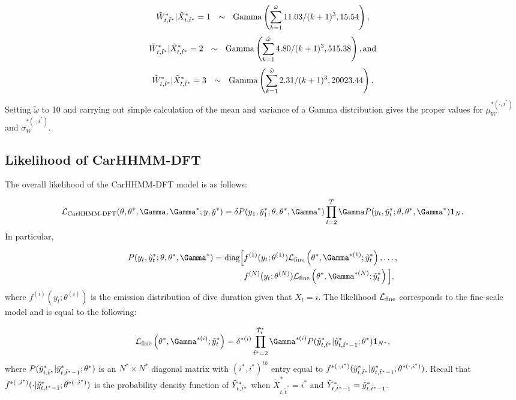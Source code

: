 \[
    \tilde{W}^*_{t,\tilde t^*}|\tilde X^*_{t,\tilde t^*} = 1  ~~ \sim ~~ {\rm{Gamma}}\left(\sum_{k=1}^{\tilde \omega} 11.03/(k+1)^3 , 15.54 \right),
\]
%
\[
    \tilde{W}^*_{t,\tilde t^*}|\tilde X^*_{t,\tilde t^*} = 2 ~~\sim~~ {\rm{Gamma}}\left(\sum_{k=1}^{\tilde \omega} 4.80/(k+1)^3 , 515.38 \right), \text{and}
\]
%
\[
    \tilde{W}^*_{t,\tilde t^*}|\tilde X^*_{t,\tilde t^*} = 3  ~~ \sim ~~ {\rm{Gamma}}\left(\sum_{k=1}^{\tilde \omega} 2.31/(k+1)^3 , 20023.44 \right).
\]
Setting $\tilde \omega$ to 10 and carrying out simple calculation of the mean and variance of a Gamma distribution gives the proper values for $\mu_W^{*(\cdot,i^*)}$ and $\sigma_W^{*(\cdot,i^*)}$.


\subsection{Likelihood of CarHHMM-DFT}

The overall likelihood of the CarHHMM-DFT model is as follows:

\[\calL_{\text{CarHHMM-DFT}}(\theta,\theta^*,\Gamma,\Gamma^*;y,\z) = \delta P(y_1,\z_1;\theta,\theta^*,\Gamma^*) \prod_{t=2}^T \Gamma P(y_t,\z_t;\theta,\theta^*,\Gamma^*) \mathbf{1}_N.\]
%
In particular,

\begin{align*}
P(y_t,\z_t;\theta,\theta^*,\Gamma^*)  = \text{diag}\Big[&f^{(1)}(y_t;\theta^{(1)})\calL_{\text{fine}}\left(\theta^*,\Gamma^{*(1)};\z_t\right), \ldots , \\
&f^{(N)}(y_t;\theta^{(N)})\calL_{\text{fine}}\left(\theta^*,\Gamma^{*(N)};\z_t\right) \Big],
\end{align*}
%
where $f^{(i)}(y_t;\theta^{(i)})$ is the emission distribution of dive duration given that $X_t = i$. The likelihood $\mathcal{L}_{\text{fine}}$ corresponds to the fine-scale model and is equal to the following:

\[\calL_{\text{fine}}\left(\theta^{*},\Gamma^{*(i)};\z_t\right) = \delta^{*(i)} \prod_{\tilde t^* = 2}^{\tilde T^*_t} \Gamma^{*(i)} P(\z_{t,\tilde t^*}|\z_{t,\tilde t^*-1};\theta^*) \mathbf{1}_{N^*},\]
%
where $P(\tilde{y}^*_{t,\tilde t^*}|\tilde{y}^*_{t,\tilde t^*-1};\theta^*)$ is an $N^* \times N^*$ diagonal matrix with $(i^*,i^*)^{th}$ entry equal to $f^{*(\cdot,i^*)}(\tilde{y}^*_{t,\tilde t^*}|\tilde{y}^*_{t,\tilde t^*-1}; \theta^{*(\cdot,i^*)})$.
%
Recall that $f^{*(\cdot,i^*)}(\cdot|\tilde{y}^*_{t,t^*-1}; \theta^{*(\cdot,i^*)})$ is the probability density function of $\tilde{Y}^*_{t,\tilde t^*}$ when $\tilde X^*_{t,\tilde t^*} = i^*$ and $\tilde{Y}^*_{t,\tilde t^*-1} = \tilde{y}^*_{t,\tilde t^*-1}$.


